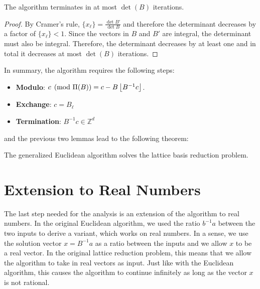 \begin{lemma}
  The algorithm terminates in at most $\det(B)$ iterations.
\end{lemma}

\begin{proof}
  By Cramer's rule, $\{x_ℓ\} = \frac{\det B'}{\det B}$
  and therefore the determinant decreases by a factor of $\{x_ℓ\} < 1$.
  Since the vectors in $B$ and $B'$ are integral, the determinant must also be integral.
  Therefore, the determinant decreases by at least one and in total it
  decreases at most $\det(B)$ iterations.
\end{proof}

In summary, the algorithm requires the following steps:
\begin{itemize}
  \item \textbf{Modulo}: $c \pmod{\Pi(B)} = c - B \left\lfloor B^{-1} c\right\rfloor$.
  \item \textbf{Exchange}: $c = B_ℓ$
  \item \textbf{Termination}: $B^{-1} c ∈ ℤ^d$
\end{itemize}
and the previous two lemmas lead to the following theorem:

\begin{theorem}
  The generalized Euclidean algorithm solves the lattice basis reduction problem.
\end{theorem}

\section{Extension to Real Numbers}

The last step needed for the analysis is an extension of the algorithm to real
numbers.
In the original Euclidean algorithm,
we used the ratio $b^{-1}a$ between the two inputs to derive a variant,
which works on real numbers.
In a sense, we use the solution vector $x = B^{-1}a$ as a ratio between the inputs
and we allow $x$ to be a real vector.
In the original lattice reduction problem, this means that we allow the
algorithm to take in real vectors as input.
Just like with the Euclidean algorithm, this causes the algorithm to continue
infinitely as long as the vector $x$ is not rational.

